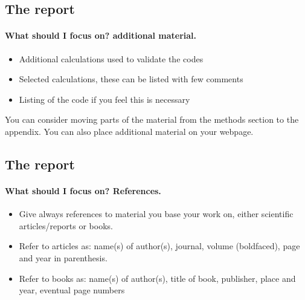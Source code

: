 \documentclass[%
oneside,                 %
final,                   %
10pt]{article}
\begin{document}
\noindent



\subsection*{The report}

\paragraph{What should I focus on? additional material.}
\begin{itemize}
 \item Additional calculations used to validate the codes

 \item Selected calculations, these can be listed with  few comments

 \item Listing of the code if you feel this is necessary
\end{itemize}

\noindent
You can consider moving parts of the material from the methods section to the appendix. You can also place additional material on your webpage.



\subsection*{The report}

\paragraph{What should I focus on? References.}
\begin{itemize}
 \item Give always references to material you base your work on, either  scientific articles/reports or books.

 \item Refer to articles as: name(s) of author(s), journal, volume (boldfaced), page and year in parenthesis.

 \item Refer to books as: name(s) of author(s), title of book, publisher, place and year, eventual page numbers
\end{itemize}

\noindent










\printindex
\end{document}
